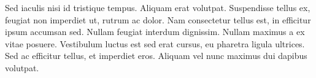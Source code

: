 \documentclass[12pt,a4paper,article]{memoir} %
\begin{document}
Sed iaculis nisi id tristique tempus. Aliquam erat volutpat. Suspendisse tellus ex, feugiat non imperdiet ut, rutrum ac dolor. Nam consectetur tellus est, in efficitur ipsum accumsan sed. Nullam feugiat interdum dignissim. Nullam maximus a ex vitae posuere. Vestibulum luctus est sed erat cursus, eu pharetra ligula ultrices. Sed ac efficitur tellus, et imperdiet eros. Aliquam vel nunc maximus dui dapibus volutpat.
\end{document}
